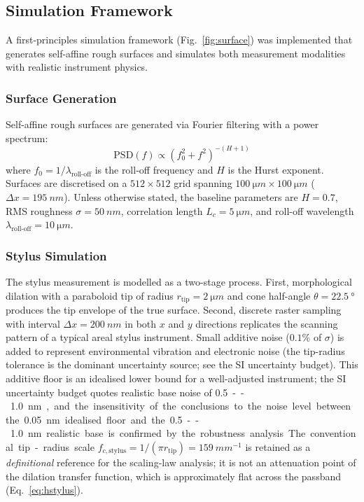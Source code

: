 \documentclass[review,12pt]{elsarticle}
\begin{document}
\subsection{Simulation Framework}
\label{sec:simulation}

A first-principles simulation framework (Fig.~\ref{fig:surface}) was implemented that generates self-affine rough surfaces and simulates both measurement modalities with realistic instrument physics.

\subsubsection{Surface Generation}

Self-affine rough surfaces are generated via Fourier filtering with a power spectrum:
\begin{equation}
    \mathrm{PSD}(f) \propto \left(f_0^2 + f^2\right)^{-(H+1)}
    \label{eq:psd_model}
\end{equation}
where $f_0 = 1/\lambda_\mathrm{roll\text{-}off}$ is the roll-off frequency and $ H$ is the Hurst exponent. Surfaces are discretised on a $512 \times 512$ grid spanning $\SI{100}{\micro m} \times \SI{100}{\micro m}$ ($\Delta x = \SI{195}{nm}$). Unless otherwise stated, the baseline parameters are $H = 0.7$, RMS roughness $\sigma = \SI{50}{nm}$, correlation length $L_c = \SI{5}{\micro m}$, and roll-off wavelength $\lambda_\mathrm{roll\text{-}off} = \SI{10}{\micro m}$.

\subsubsection{Stylus Simulation}

The stylus measurement is modelled as a two-stage process. First, morphological dilation with a paraboloid tip of radius $r_\mathrm{tip} = \SI{2}{\micro m}$ and cone half-angle $\theta = \SI{22.5}{\degree}$ produces the tip envelope of the true surface. Second, discrete raster sampling with interval $\Delta x = \SI{200}{nm}$ in both $x$ and $y$ directions replicates the scanning pattern of a typical areal stylus instrument. Small additive noise ($0.1\%$ of $\sigma$) is added to represent environmental vibration and electronic noise (the tip-radius tolerance is the dominant uncertainty source; see the SI uncertainty budget). This additive floor is an idealised lower bound for a well-adjusted instrument; the SI uncertainty budget quotes realistic base noise of \SI{0.5}--\SI{1.0}{nm}, and the insensitivity of the conclusions to the noise level between the \SI{0.05}{nm} idealised floor and the \SI{0.5}--\SI{1.0}{nm} realistic base is confirmed by the robustness analysis. The conventional tip-radius scale $f_{c,\mathrm{stylus}} = 1/(\pi r_\mathrm{tip}) = \SI{159}{mm^{-1}}$ is retained as a \emph{definitional} reference for the scaling-law analysis; it is not an attenuation point of the dilation transfer function, which is approximately flat across the passband (Eq.~\ref{eq:hstylus}).
\end{document}
